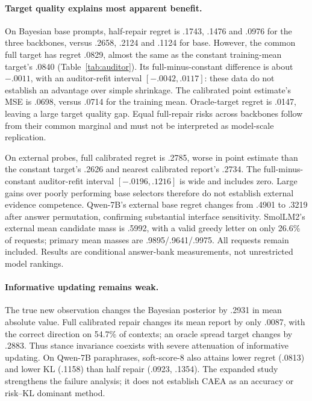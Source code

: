 \paragraph{Target quality explains most apparent benefit.}
On Bayesian base prompts, half-repair regret is .1743, .1476 and .0976 for
the three backbones, versus .2658, .2124 and .1124 for base. However, the
common full target has regret .0829, almost the same as the constant
training-mean target's .0840 (Table~\ref{tab:auditor}). Its full-minus-constant
difference is about $-.0011$, with an auditor-refit interval
$[-.0042,.0117]$: these data do not establish an advantage over simple
shrinkage. The calibrated point estimate's MSE is .0698, versus .0714 for
the training mean. Oracle-target regret is .0147, leaving a large target
quality gap. Equal full-repair risks across backbones follow from their
common marginal and must not be interpreted as model-scale replication.

\begin{table}[t]
\centering\small
\caption{Report regret for targets shared across backbones (base condition).
Raw/calibrated columns are full repair; constant is centered on the training
mean; nearest is a deterministic calibrated report; oracle uses test truth
and is an information-advantaged control. None establishes free-text accuracy.}
\label{tab:auditor}

\end{table}

On external probes, full calibrated regret is .2785, worse in point estimate
than the constant target's .2626 and nearest calibrated report's .2734.
The full-minus-constant auditor-refit interval $[-.0196,.1216]$ is wide and
includes zero. Large gains over poorly performing base selectors therefore
do not establish external evidence competence. Qwen-7B's external base
regret changes from .4901 to .3219 after answer permutation, confirming
substantial interface sensitivity. SmolLM2's external mean candidate mass
is .5992, with a valid greedy letter on only 26.6\% of requests; primary
mean masses are .9895/.9641/.9975. All requests remain included. Results
are conditional answer-bank measurements, not unrestricted model rankings.

\paragraph{Informative updating remains weak.}
The true new observation changes the Bayesian posterior by .2931 in mean
absolute value. Full calibrated repair changes its mean report by only
.0087, with the correct direction on 54.7\% of contexts; an oracle spread
target changes by .2883. Thus stance invariance coexists with severe
attenuation of informative updating. On Qwen-7B paraphrases, soft-score-8
also attains lower regret (.0813) and lower KL (.1158) than half repair
(.0923, .1354). The expanded study strengthens the failure analysis; it does
not establish CAEA as an accuracy or risk--KL dominant method.

